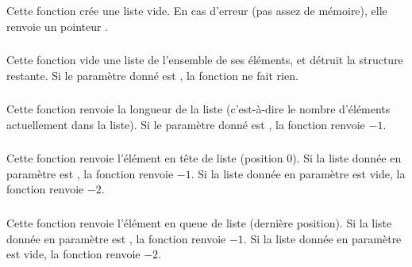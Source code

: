 \subsubsection*{}

\noindent Cette fonction crée une liste vide.
En cas d'erreur (pas assez de mémoire), elle renvoie un pointeur .


\subsubsection*{}

\noindent Cette fonction vide une liste de l'ensemble de ses éléments, et détruit la structure restante.
Si le paramètre donné est , la fonction ne fait rien.


\subsubsection*{}

\noindent Cette fonction renvoie la longueur de la liste (c'est-à-dire le nombre d'éléments actuellement dans la liste).
Si le paramètre donné est , la fonction renvoie $ -1 $.


\subsubsection*{}

\noindent Cette fonction renvoie l'élément en tête de liste (position 0).
Si la liste donnée en paramètre est , la fonction renvoie $ -1 $.
Si la liste donnée en paramètre est vide, la fonction renvoie $ -2 $.


\subsubsection*{}

\noindent Cette fonction renvoie l'élément en queue de liste (dernière position).
Si la liste donnée en paramètre est , la fonction renvoie $ -1 $.
Si la liste donnée en paramètre est vide, la fonction renvoie $ -2 $.


\subsubsection*{}


